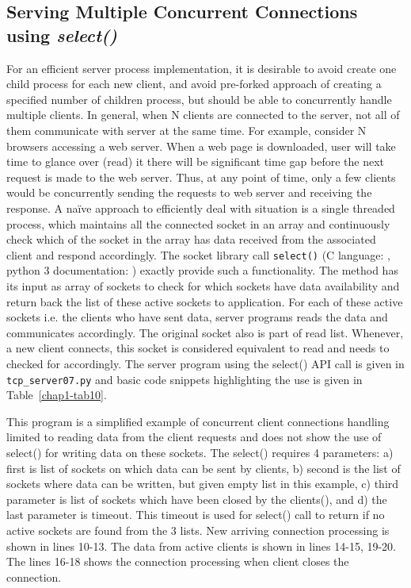 \begin{multicols}{2}
\section{Serving Multiple Concurrent Connections using \textit{select()}}

For an efficient server process implementation, it is desirable to avoid create one child process for each new client, and avoid pre-forked approach of creating a specified number of children process, but should be able to concurrently handle multiple clients. In general, when N clients are connected to the server, not all of them communicate with server at the same time. For example, consider N browsers accessing a web server. When a web page is downloaded, user will take time to glance over (read) it there will be significant time gap before the next request is made to the web server. Thus, at any point of time, only a few clients would be concurrently sending the requests to web server and receiving the response. A naïve approach to efficiently deal with situation is a single threaded process, which maintains all the connected socket in an array and continuously check which of the socket in the array has data received from the associated client and respond accordingly. The socket library call \texttt{select()} (C language: \cite{art1-key14}, python 3 documentation: \cite{art1-key15}) exactly provide such a functionality. The method has its input as array of sockets to check for which sockets have data availability and return back the list of these active sockets to application. For each of these active sockets i.e. the clients who have sent data, server programs reads the data and communicates accordingly. The original socket also is part of read list. Whenever, a new client connects, this socket is considered equivalent to read and needs to checked for accordingly. The server program using the select() API call is given in \texttt{tcp\_server07.py} and basic code snippets highlighting the use is given in Table~\ref{chap1-tab10}.


This program is a simplified example of concurrent client connections handling limited to reading data from the client requests and does not show the use of select() for writing data on these sockets. The select() requires 4 parameters: a) first is list of sockets on which data can be sent by clients, b) second is the list of sockets where data can be written, but given empty list in this example, c) third parameter is list of sockets which have been closed by the clients(), and d) the last parameter is timeout. This timeout is used for select() call to return if no active sockets are found from the 3 lists. New arriving connection processing is shown in lines 10-13. The data from active clients is shown in lines 14-15, 19-20. The lines 16-18 shows the connection processing when client closes the connection.


\end{multicols}
